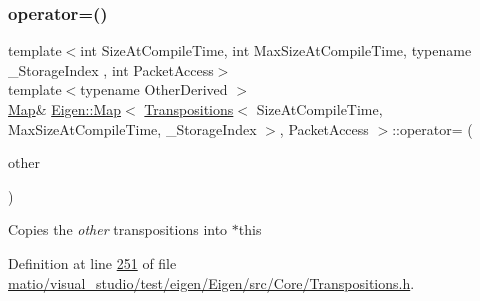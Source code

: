 \mbox{\label{class_eigen_1_1_map_3_01_transpositions_3_01_size_at_compile_time_00_01_max_size_at_compile_timecc993082d7c0ba51ca94b27e97da8dd3_a903d189a8b363033ec9b1cba0190b11b}} 
\subsubsection{\texorpdfstring{operator=()}{operator=()}\hspace{0.1cm}{\footnotesize\ttfamily [1/4]}}
{\footnotesize\ttfamily template$<$int Size\+At\+Compile\+Time, int Max\+Size\+At\+Compile\+Time, typename \+\_\+\+Storage\+Index , int Packet\+Access$>$ \\
template$<$typename Other\+Derived $>$ \\
\hyperlink{group___core___module_class_eigen_1_1_map}{Map}\& \hyperlink{group___core___module_class_eigen_1_1_map}{Eigen\+::\+Map}$<$ \hyperlink{group___core___module_class_eigen_1_1_transpositions}{Transpositions}$<$ Size\+At\+Compile\+Time, Max\+Size\+At\+Compile\+Time, \+\_\+\+Storage\+Index $>$, Packet\+Access $>$\+::operator= (\begin{DoxyParamCaption}\item[{const \hyperlink{class_eigen_1_1_transpositions_base}{Transpositions\+Base}$<$ Other\+Derived $>$ \&}]{other }\end{DoxyParamCaption})\hspace{0.3cm}{\ttfamily [inline]}}

Copies the {\itshape other} transpositions into {\ttfamily $\ast$this} 

Definition at line \hyperlink{matio_2visual__studio_2test_2eigen_2_eigen_2src_2_core_2_transpositions_8h_source_l00251}{251} of file \hyperlink{matio_2visual__studio_2test_2eigen_2_eigen_2src_2_core_2_transpositions_8h_source}{matio/visual\+\_\+studio/test/eigen/\+Eigen/src/\+Core/\+Transpositions.\+h}.


